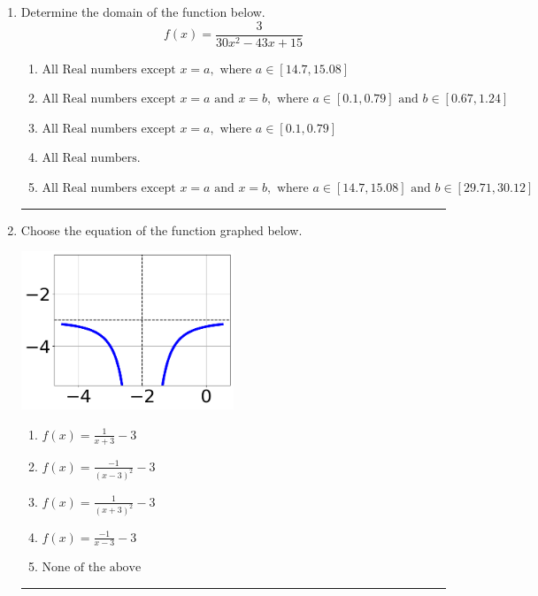 \documentclass[14pt]{extbook}
\newcommand{\litem}[1]{\item#1\hspace*{-1cm}\rule{\textwidth}{0.4pt}}
\begin{document}
\begin{enumerate}
{\begin{enumerate}[label=\Alph*.]
\end{enumerate} }
\litem{
Determine the domain of the function below.\[ f(x) = \frac{3}{30x^{2} -43 x + 15} \]\begin{enumerate}[label=\Alph*.]
\item \( \text{All Real numbers except } x = a, \text{ where } a \in [14.7, 15.08] \)
\item \( \text{All Real numbers except } x = a \text{ and } x = b, \text{ where } a \in [0.1, 0.79] \text{ and } b \in [0.67, 1.24] \)
\item \( \text{All Real numbers except } x = a, \text{ where } a \in [0.1, 0.79] \)
\item \( \text{All Real numbers.} \)
\item \( \text{All Real numbers except } x = a \text{ and } x = b, \text{ where } a \in [14.7, 15.08] \text{ and } b \in [29.71, 30.12] \)

\end{enumerate} }
\litem{
Choose the equation of the function graphed below.
\begin{center}
    \includegraphics[width=0.5\textwidth]{../Figures/rationalGraphToEquationCopyB.png}
\end{center}
\begin{enumerate}[label=\Alph*.]
\item \( f(x) = \frac{1}{x + 3} - 3 \)
\item \( f(x) = \frac{-1}{(x - 3)^2} - 3 \)
\item \( f(x) = \frac{1}{(x + 3)^2} - 3 \)
\item \( f(x) = \frac{-1}{x - 3} - 3 \)
\item \( \text{None of the above} \)


\end{enumerate}}
\end{enumerate}
\end{document}
